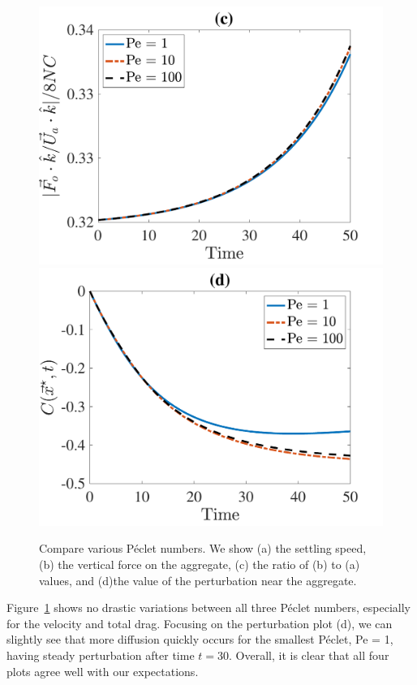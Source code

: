 \begin{figure}[ht]
\begin{center}
		\includegraphics[scale=0.35]{./figures/fig_NC50_Pe_Fo3Ua_ratio}
		\includegraphics[scale=0.35]{./figures/fig_NC50_Pe_C_star}
	\caption{Compare various Péclet numbers. We show (a) the settling speed, (b) the vertical force on the aggregate, (c) the ratio of (b) to (a) values, and (d)the value of the perturbation near the aggregate.}
	\label{fig_NC50_Pe}
\end{center}
\end{figure}
\par
Figure~\ref{fig_NC50_Pe} shows no drastic variations between all three Péclet numbers, especially for the velocity and total drag. 
Focusing on the perturbation plot (d), we can slightly see that more diffusion quickly occurs for the smallest Péclet, Pe = 1, having steady perturbation after time $t = 30$.
Overall, it is clear that all four plots agree well with our expectations. 
